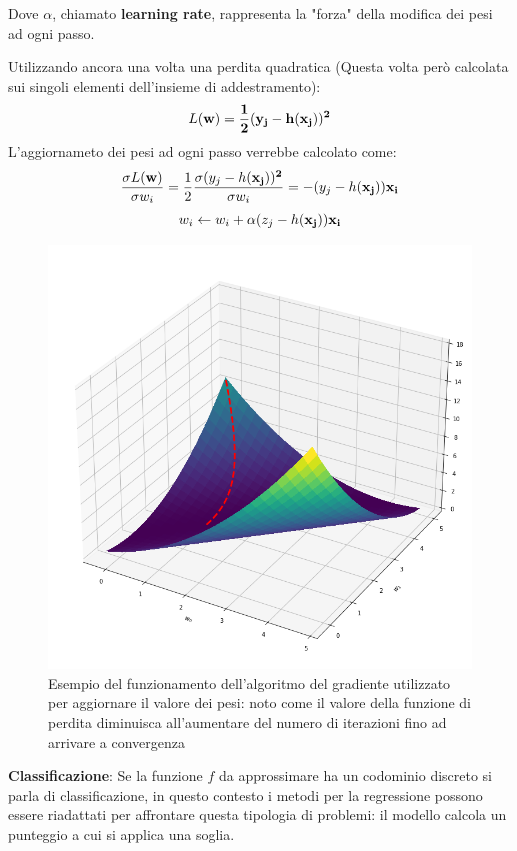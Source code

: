 \documentclass[../../main.tex]{subfiles}
\begin{document}
    Dove $\alpha$, chiamato \textbf{learning rate}, rappresenta la "forza" della modifica dei pesi ad ogni passo.

    Utilizzando ancora una volta una perdita quadratica (Questa volta però calcolata sui singoli elementi dell'insieme di addestramento):
    \[L(\bf{w}) = \frac{1}{2}(y_j - h(\bf{x_j}))^2\]
    L'aggiornameto dei pesi ad ogni passo verrebbe calcolato come:
    \[\frac{\sigma L(\bf{w})}{\sigma w_i} = \frac{1}{2}\frac{\sigma(y_j - h(\bf{x_j}))^2}{\sigma w_i} = - (y_j - h(\bf{x_j})) x_i\]
    \[w_i \leftarrow w_i + \alpha (z_j - h(\bf{x_j})) x_i\]
    \begin{figure}[h!]
        \centering
        \includegraphics[width = \textwidth/2]{immagini/4_1/loss_function.png}
        \caption{Esempio del funzionamento dell'algoritmo del gradiente utilizzato per aggiornare il valore dei pesi: noto come il valore della funzione di perdita diminuisca all'aumentare del numero di iterazioni fino ad arrivare a convergenza}
    \end{figure}
   

    \textbf{Classificazione}: Se la funzione $f$ da approssimare ha un codominio discreto si parla di classificazione, in questo contesto i metodi per la regressione possono essere riadattati per affrontare questa tipologia di problemi: il modello calcola un punteggio a cui si applica una soglia.
\end{document}
